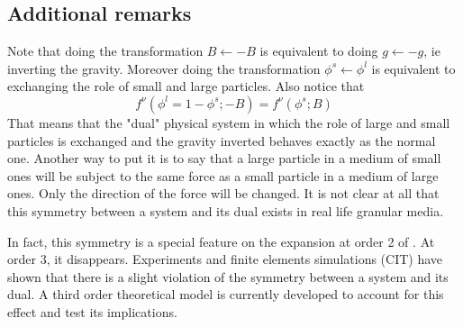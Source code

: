 \documentclass[11pt]{book}
\begin{document}
\subsection{Additional remarks}

Note that doing the transformation $B \leftarrow -B$ is equivalent to doing $g \leftarrow -g$, ie inverting the gravity. Moreover doing the transformation $\phi^s \leftarrow \phi^l$ is equivalent to exchanging the role of small and large particles. Also notice that
\begin{equation}
	f^\nu(\phi^l = 1 - \phi^s; -B) = f^\nu( \phi^s; B)
\end{equation}
That means that the "dual" physical system in which the role of large and small particles is exchanged and the gravity inverted behaves exactly as the normal one. Another way to put it is to say that a large particle in a medium of small ones will be subject to the same force as a small particle in a medium of large ones. Only the direction of the force will be changed. It is not clear at all that this symmetry between a system and its dual exists in real life granular media. 

In fact, this symmetry is a special feature on the expansion at order 2 of \cite{eq:expansion}. At order 3, it disappears. Experiments and finite elements simulations (CIT) have shown that there is a slight violation of the symmetry between a system and its dual. A third order  theoretical model is currently developed to account for this effect and test its implications.
\end{document}
